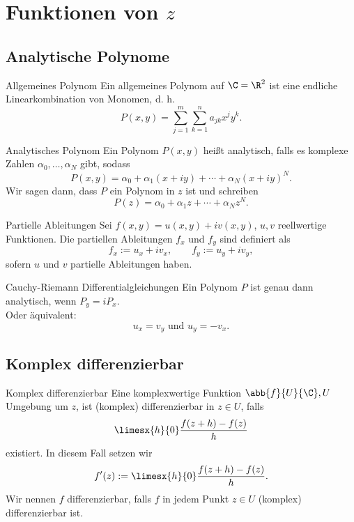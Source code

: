 \section{Funktionen von \(z\)}

\subsection{Analytische Polynome}

\begin{karte}{Allgemeines Polynom}
    Ein allgemeines Polynom auf \(\C = \R^2\) 
    ist eine endliche Linearkombination von Monomen, d. h. 
    \[ P(x,y) = \sum_{j=1}^m \sum_{k=1}^n a_{jk} x^j y^k. \]
\end{karte}

\begin{karte}{Analytisches Polynom}
    Ein Polynom \(P(x,y)\) heißt analytisch, falls es komplexe Zahlen 
    \( \alpha_0, \ldots, \alpha_N \) gibt, sodass 
    \[ P(x,y) = \alpha_0 + \alpha_1 (x+iy) + \cdots + \alpha_N (x+iy)^N. \]
    Wir sagen dann, dass \(P\) ein Polynom in \(z\) ist und schreiben 
    \[ P(z) = \alpha_0 + \alpha_1 z + \cdots + \alpha_N z^N. \]
\end{karte}

\begin{karte}{Partielle Ableitungen}
    Sei \( f(x,y) = u(x,y) + iv(x,y) \), \(u,v\) reellwertige Funktionen. 
    Die partiellen Ableitungen \(f_x\) und \(f_y\) sind definiert als 
    \[ f_x := u_x + i v_x, \qquad f_y := u_y + i v_y, \]
    sofern \(u\) und \(v\) partielle Ableitungen haben. 
\end{karte}

\begin{karte}{Cauchy-Riemann Differentialgleichungen}
    Ein Polynom \(P\) ist genau dann analytisch, wenn \(P_y = i P_x\).\\
    Oder äquivalent: 
    \[ u_x = v_y \text{ und } u_y = -v_x. \]
\end{karte}

\subsection{Komplex differenzierbar}

\begin{karte}{Komplex differenzierbar}
    Eine komplexwertige Funktion \(\abb{f}{U}{\C}, U\) Umgebung um \(z\), 
    ist (komplex) differenzierbar in \(z\in U\), falls 
    \[ \limesx{h}{0} \frac{f(z+h) - f(z)}{h} \] existiert. 
    In diesem Fall setzen wir 
    \[ f'(z) := \limesx{h}{0} \frac{f(z+h) - f(z)}{h}. \]
    Wir nennen \(f\) differenzierbar, falls \(f\) in jedem Punkt \(z\in U\) (komplex) 
    differenzierbar ist.
\end{karte}

